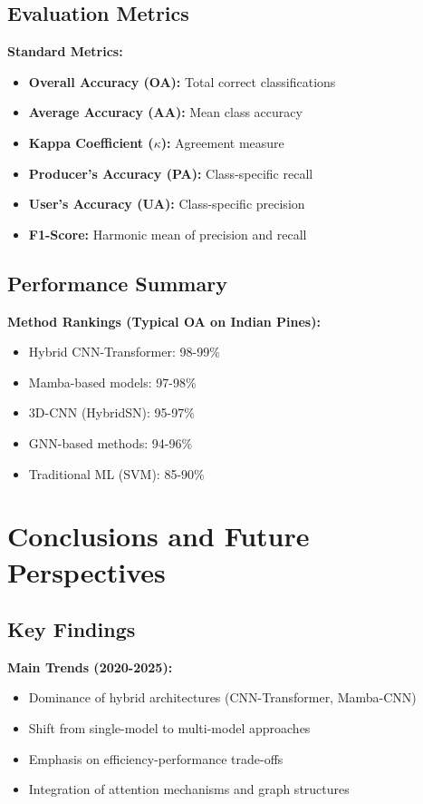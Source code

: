 \documentclass[12pt,a4paper]{article}
\begin{document}
\subsection{Evaluation Metrics}

\textbf{Standard Metrics:}
\begin{itemize}
\item \textbf{Overall Accuracy (OA):} Total correct classifications
\item \textbf{Average Accuracy (AA):} Mean class accuracy
\item \textbf{Kappa Coefficient ($\kappa$):} Agreement measure
\item \textbf{Producer's Accuracy (PA):} Class-specific recall
\item \textbf{User's Accuracy (UA):} Class-specific precision
\item \textbf{F1-Score:} Harmonic mean of precision and recall
\end{itemize}

\subsection{Performance Summary}

\textbf{Method Rankings (Typical OA on Indian Pines):}
\begin{itemize}
\item Hybrid CNN-Transformer: 98-99\%
\item Mamba-based models: 97-98\%
\item 3D-CNN (HybridSN): 95-97\%
\item GNN-based methods: 94-96\%
\item Traditional ML (SVM): 85-90\%
\end{itemize}

\section{Conclusions and Future Perspectives}

\subsection{Key Findings}

\textbf{Main Trends (2020-2025):}
\begin{itemize}
\item Dominance of hybrid architectures (CNN-Transformer, Mamba-CNN)
\item Shift from single-model to multi-model approaches
\item Emphasis on efficiency-performance trade-offs
\item Integration of attention mechanisms and graph structures
\end{itemize}
\end{document}
